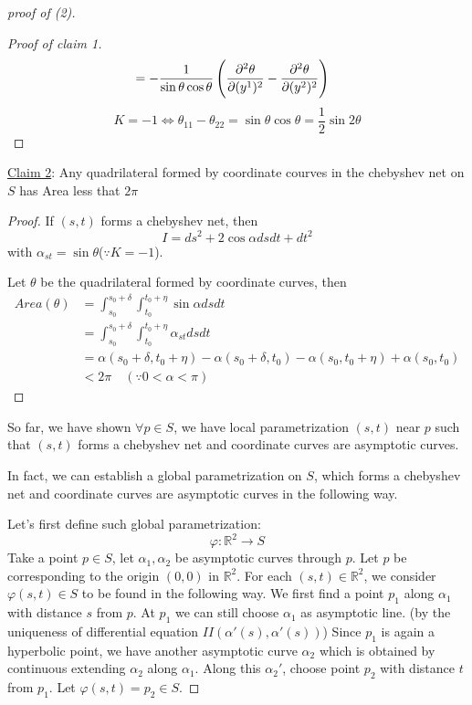 \begin{proof}[proof of (2)]
\begin{proof}[Proof of claim 1]
\begin{align*}
        &=-\frac{1}{\sin\theta\cos\theta}\left(
            \pdv[2]{\theta}{(y^1)}-\pdv[2]{\theta}{(y^2)}
        \right)
    \end{align*}
    \[K=-1\Leftrightarrow \theta_{11}-\theta_{22}=\sin\theta\cos\theta
    =\frac{1}{2}\sin 2\theta \tag{1}\]
    \end{proof}
    \underline{Claim 2}: Any quadrilateral formed by coordinate courves
    in the chebyshev net on \(S\) has Area less that \(2\pi\)
    \begin{proof}
        If \((s,t)\) forms a chebyshev net, then 
        \[
            I=ds^2+2\cos\alpha ds dt+dt^2    
        \]
        with \(\alpha_{st}=\sin\theta\)(\(\because K=-1\)).

        Let \(\theta\) be the quadrilateral formed by coordinate curves,
        then 
        \begin{align*}
            Area(\theta)&=\int_{s_0}^{s_0+\delta}\int_{t_0}^{t_0+\eta}
            \sin \alpha ds dt \\
            &=\int_{s_0}^{s_0+\delta}\int_{t_0}^{t_0+\eta} \alpha_{st}ds dt\\
            &=\alpha(s_0+\delta,t_0+\eta)-\alpha(s_0+\delta,t_0)
            -\alpha(s_0,t_0+\eta)+\alpha(s_0,t_0)\\
            &<2\pi\quad(\because 0<\alpha<\pi)
        \end{align*}
    \end{proof}
    So far, we have shown \(\forall p\in S\), we have local parametrization
    \((s,t)\) near \(p\) such that \((s,t)\) forms a chebyshev net and 
    coordinate curves are asymptotic curves.

    In fact, we can establish a global parametrization on \(S\), which
    forms a chebyshev net and coordinate curves are asymptotic curves
    in the following way.

    Let's first define such global parametrization:
    \[
        \varphi\colon \mathbb{R}^2 \to S   
    \]
    Take a point \(p\in S\), let \(\alpha_1,\alpha_2\) be asymptotic curves
    through \(p\). Let \(p\) be corresponding to the origin \((0,0)\)
    in \(\mathbb{R}^2\). For each \((s,t)\in\mathbb{R}^2\), we consider
    \(\varphi(s,t)\in S\) to be found in the following way. We first
    find a point \(p_1\) along \(\alpha_1\) with distance \(s\) from 
    \(p\). At \(p_1\) we can still choose \(\alpha_1\) as asymptotic line.
    (by the uniqueness of differential equation \(II(\alpha'(s),\alpha'(s))\))
    Since \(p_1\) is again a hyperbolic point, we have another asymptotic curve
    \(\alpha_2\) which is obtained by continuous extending
    \(\alpha_2\) along \(\alpha_1\). Along this \(\alpha_2'\),
    choose point \(p_2\) with distance \(t\) from \(p_1\).
    Let \(\varphi(s,t)=p_2\in S\).


\end{proof}
